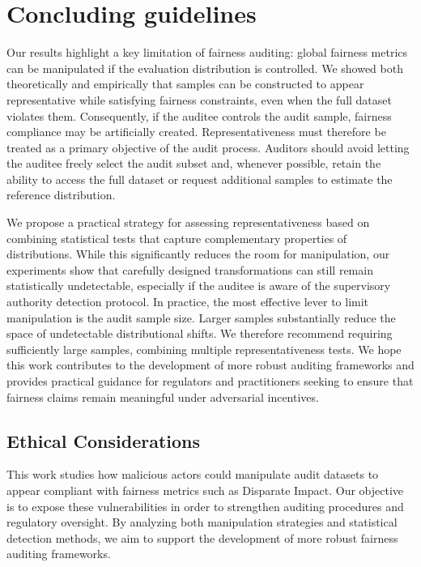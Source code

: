 \documentclass[runningheads, orivec]{llncs}
\begin{document}
\section{Concluding guidelines}

Our results highlight a key limitation of fairness auditing: global fairness metrics can be manipulated if the evaluation distribution is controlled. We showed both theoretically and empirically that samples can be constructed to appear representative while satisfying fairness constraints, even when the full dataset violates them. Consequently, if the auditee controls the audit sample, fairness compliance may be artificially created. Representativeness must therefore be treated as a primary objective of the audit process. Auditors should avoid letting the auditee freely select the audit subset and, whenever possible, retain the ability to access the full dataset or request additional samples to estimate the reference distribution.

We propose a practical strategy for assessing representativeness based on combining statistical tests that capture complementary properties of distributions. While this significantly reduces the room for manipulation, our experiments show that carefully designed transformations can still remain statistically undetectable, especially if the auditee is aware of the supervisory authority detection protocol. In practice, the most effective lever to limit manipulation is the audit sample size. Larger samples substantially reduce the space of undetectable distributional shifts. We therefore recommend requiring sufficiently large samples, combining multiple representativeness tests. We hope this work contributes to the development of more robust auditing frameworks and provides practical guidance for regulators and practitioners seeking to ensure that fairness claims remain meaningful under adversarial incentives.

\subsection*{Ethical Considerations}

This work studies how malicious actors could manipulate audit datasets to appear compliant with fairness metrics such as Disparate Impact. Our objective is to expose these vulnerabilities in order to strengthen auditing procedures and regulatory oversight. By analyzing both manipulation strategies and statistical detection methods, we aim to support the development of more robust fairness auditing frameworks.
\end{document}
